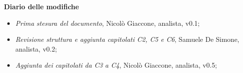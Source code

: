 \documentclass[a4paper]{article}
\begin{document}
    \begin{center}
       \textbf{Diario delle modifiche}
        \begin{itemize}
            \item \textit{Prima stesura del documento}, Nicolò Giaccone, analista, v0.1;
            \item \textit{Revisione struttura e aggiunta capitolati C2, C5 e C6}, Samuele De Simone, analista, v0.2;
            \item \textit{Aggiunta dei capitolati da C3 a C4}, Nicolò Giaccone, analista, v0.5;
        \end{itemize}
    \end{center}
    \newpage
\tableofcontents
\newpage








\end{document}
